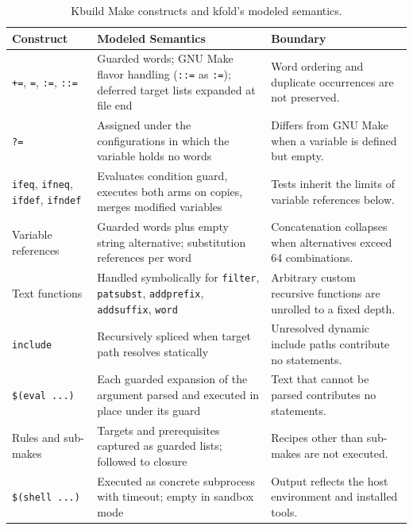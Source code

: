 \documentclass[acmsmall]{acmart}
\newcommand{\tool}{\textsf{kfold}\xspace}
\begin{document}
\begin{table}[t]
\centering\footnotesize
\caption{Kbuild Make constructs and \tool's modeled semantics.}
\label{tab:make-scope}
\begin{tabular}{p{28mm}p{48mm}p{48mm}}
\toprule
Construct & Modeled Semantics & Boundary \\
\midrule
\texttt{+=}, \texttt{=}, \texttt{:=}, \texttt{::=} & Guarded words; GNU Make flavor handling (\texttt{::=} as \texttt{:=}); deferred target lists expanded at file end & Word ordering and duplicate occurrences are not preserved. \\
\texttt{?=} & Assigned under the configurations in which the variable holds no words & Differs from GNU Make when a variable is defined but empty. \\
\texttt{ifeq}, \texttt{ifneq}, \texttt{ifdef}, \texttt{ifndef} & Evaluates condition guard, executes both arms on copies, merges modified variables & Tests inherit the limits of variable references below. \\
Variable references & Guarded words plus empty string alternative; substitution references per word & Concatenation collapses when alternatives exceed 64 combinations. \\
Text functions & Handled symbolically for \texttt{filter}, \texttt{patsubst}, \texttt{addprefix}, \texttt{addsuffix}, \texttt{word} & Arbitrary custom recursive functions are unrolled to a fixed depth. \\
\texttt{include} & Recursively spliced when target path resolves statically & Unresolved dynamic include paths contribute no statements. \\
\texttt{\$(eval ...)} & Each guarded expansion of the argument parsed and executed in place under its guard & Text that cannot be parsed contributes no statements. \\
Rules and sub-makes & Targets and prerequisites captured as guarded lists; followed to closure & Recipes other than sub-makes are not executed. \\
\texttt{\$(shell ...)} & Executed as concrete subprocess with timeout; empty in sandbox mode & Output reflects the host environment and installed tools. \\
\bottomrule
\end{tabular}
\end{table}
\end{document}

